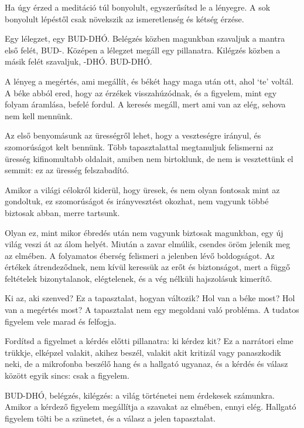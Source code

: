 Ha úgy érzed a meditáció túl bonyolult, egyszerűsítsd le a lényegre. A
sok bonyolult lépéstől csak növekszik az ismeretlenség és kétség érzése.

Egy lélegzet, egy BUD-DHÓ. Belégzés közben magunkban szavaljuk a mantra
első felét, BUD-. Középen a lélegzet megáll egy pillanatra. Kilégzés
közben a másik felét szavaljuk, -DHÓ. BUD-DHÓ.

A lényeg a megértés, ami megállít, és békét hagy maga után ott, ahol
`te' voltál. A béke abból ered, hogy az érzékek visszahúzódnak, és a
figyelem, mint egy folyam áramlása, befelé fordul. A keresés megáll,
mert ami van az elég, sehova nem kell mennünk.


Az első benyomásunk az ürességről lehet, hogy a veszteségre irányul, és
szomorúságot kelt bennünk. Több tapasztalattal megtanuljuk felismerni az
üresség kifinomultabb oldalait, amiben nem birtoklunk, de nem is
vesztettünk el semmit: ez az üresség felszabadító.

Amikor a világi célokról kiderül, hogy üresek, és nem olyan fontosak
mint az gondoltuk, ez szomorúságot és irányvesztést okozhat, nem vagyunk
többé biztosak abban, merre tartsunk.

Olyan ez, mint mikor ébredés után nem vagyunk biztosak magunkban, egy új
világ veszi át az álom helyét. Miután a zavar elmúlik, csendes öröm
jelenik meg az elmében. A folyamatos éberség felismeri a jelenben lévő
boldogságot. Az értékek átrendeződnek, nem kívül keressük az erőt és
biztonságot, mert a függő feltételek bizonytalanok, elégtelenek, és a
vég nélküli hajszolásuk kimerítő.

Ki az, aki szenved? Ez a tapasztalat, hogyan változik? Hol van a béke
most? Hol van a megértés most? A tapasztalat nem egy megoldani való
probléma. A tudatos figyelem vele marad és felfogja.

\enlargethispage*{\baselineskip}

Fordítsd a figyelmet a kérdés előtti pillanatra: ki kérdez kit? Ez a
narrátori elme trükkje, elképzel valakit, akihez beszél, valakit akit
kritizál vagy panaszkodik neki, de a mikrofonba beszélő hang és a
hallgató ugyanaz, és a kérdés és válasz között egyik sincs: csak a
figyelem.

\clearpage


BUD-DHÓ, belégzés, kilégzés: a világ történetei nem érdekesek számunkra.
Amikor a kérdező figyelem megállítja a szavakat az elmében, ennyi elég.
Hallgató figyelem tölti be a szünetet, és a válasz a jelen tapasztalat.

